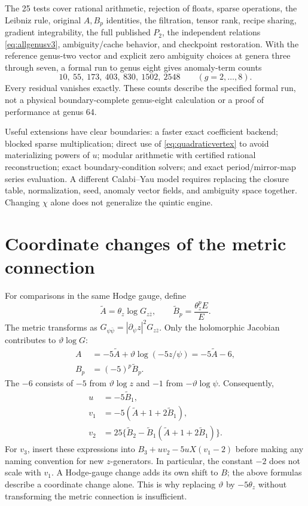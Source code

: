 \documentclass[11pt,a4paper]{article}
\numberwithin{equation}{section}
\newcommand{\tht}{\vartheta}
\newcommand{\del}{\partial}
\begin{document}
The 25 tests cover rational arithmetic, rejection of floats, sparse operations,
the Leibniz rule, original $A,B_p$ identities, the filtration, tensor rank,
recipe sharing, gradient integrability, the full published $P_2$, the independent
relations \eqref{eq:allgenusv3}, ambiguity/cache behavior, and checkpoint restoration.
With the reference genus-two vector and explicit zero ambiguity choices at
genera three through seven, a formal run to genus eight gives anomaly-term counts
\begin{equation}
10,\ 55,\ 173,\ 403,\ 830,\ 1502,\ 2548\qquad(g=2,\ldots,8).
\end{equation}
Every residual vanishes exactly. These counts describe the specified formal
run, not a physical boundary-complete genus-eight calculation or a proof of
performance at genus 64.

Useful extensions have clear boundaries: a faster exact coefficient backend;
blocked sparse multiplication; direct use of \eqref{eq:quadraticvertex} to
avoid materializing powers of $u$; modular arithmetic with certified rational
reconstruction; exact boundary-condition solvers; and exact period/mirror-map
series evaluation. A different Calabi--Yau model requires replacing the closure
table, normalization, seed, anomaly vector fields, and ambiguity space together.
Changing $\chi$ alone does not generalize the quintic engine.

\appendix
\section{Coordinate changes of the metric connection}
For comparisons in the same Hodge gauge, define
\begin{equation}
\widetilde A=\theta_z\log G_{z\bar z},\qquad
\widetilde B_p=\frac{\theta_z^pE}{E}.
\end{equation}
The metric transforms as
$G_{\psi\bar\psi}=|\del_\psi z|^2G_{z\bar z}$.
Only the holomorphic Jacobian contributes to $\tht\log G$:
\begin{align}
A&=-5\widetilde A+\tht\log(-5z/\psi)
  =-5\widetilde A-6,\\
B_p&=(-5)^p\widetilde B_p.
\end{align}
The $-6$ consists of $-5$ from $\tht\log z$ and $-1$
from $-\tht\log\psi$. Consequently,
\begin{align}
u&=-5\widetilde B_1,\\
v_1&=-5(\widetilde A+1+2\widetilde B_1),\\
v_2&=25\{\widetilde B_2-
    \widetilde B_1(\widetilde A+1+2\widetilde B_1)\}.
\end{align}
For $v_3$, insert these expressions into
$B_3+uv_2-5uX(v_1-2)$ before making any naming convention for new
$z$-generators. In particular, the constant $-2$ does not scale with $v_1$.
A Hodge-gauge change adds its own shift to $B$; the above formulas describe
a coordinate change alone. This is why replacing $\tht$ by $-5\theta_z$
without transforming the metric connection is insufficient.
\end{document}
